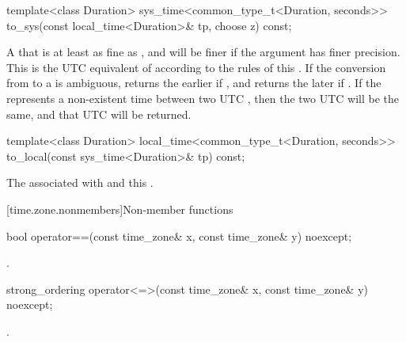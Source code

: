 %
\begin{itemdecl}
template<class Duration>
  sys_time<common_type_t<Duration, seconds>>
    to_sys(const local_time<Duration>& tp, choose z) const;
\end{itemdecl}

\begin{itemdescr}
\pnum
\returns
A  that is at least as fine as ,
and will be finer if the argument  has finer precision.
This  is the UTC equivalent of 
according to the rules of this .
If the conversion from  to a  is ambiguous,
returns the earlier  if , and
returns the later  if .
If the  represents a non-existent time between two UTC ,
then the two UTC  will be the same,
and that UTC  will be returned.
\end{itemdescr}

%
\begin{itemdecl}
template<class Duration>
  local_time<common_type_t<Duration, seconds>>
    to_local(const sys_time<Duration>& tp) const;
\end{itemdecl}

\begin{itemdescr}
\pnum
\returns
The  associated with  and this .
\end{itemdescr}

[time.zone.nonmembers]{Non-member functions}

%
\begin{itemdecl}
bool operator==(const time_zone& x, const time_zone& y) noexcept;
\end{itemdecl}

\begin{itemdescr}
\pnum
\returns
{}.
\end{itemdescr}

%
\begin{itemdecl}
strong_ordering operator<=>(const time_zone& x, const time_zone& y) noexcept;
\end{itemdecl}

\begin{itemdescr}
\pnum
\returns
{}.
\end{itemdescr}

